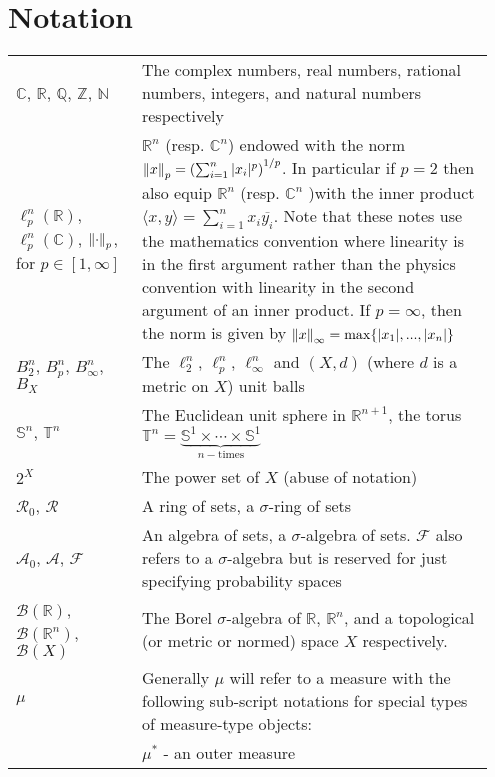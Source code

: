 \chapter*{Notation}
\begin{center}
\begin{tabular}{|p{0.25\linewidth}|p{0.7\linewidth}|}
	\hline
	$\mathbb{C}$, $\mathbb{R}$, $\mathbb{Q}$, $\mathbb{Z}$, $\mathbb{N}$ & The complex numbers, real numbers, rational numbers, integers, and natural numbers respectively \smallskip\\
	$\ell_p^n(\mathbb{R})$, $\ell_p^n(\mathbb{C})$, $\norm{\cdot}_p$, for  $p\in[1, \infty]$ & $\mathbb{R}^n$ (resp. $\mathbb{C}^n$) endowed with the norm $\norm{x}_p = \qty(\sum_{i=1}^n |x_i|^p)^{1/p}$.  In particular if $p=2$  then also equip $\mathbb{R}^n$ (resp. $\mathbb{C}^n$ )with the inner product $\langle x, y \rangle = \sum_{i=1}^n x_i\overline{y_i}$. Note that these notes use the mathematics convention where linearity is in the first argument rather than the physics convention with linearity in the second argument of an inner product. If $p=\infty$, then the norm is given by $\norm{x}_\infty = \max\{|x_1|,...,|x_n|\}$\smallskip\\
	$B_2^n$, $B_p^n$, $B_{\infty}^n$, $B_X$ & The $\ell_2^n$, $\ell_p^n$, $\ell_\infty^n$ and $(X, d)$ (where $d$ is a metric on $X$) unit balls\smallskip\\
	$\mathbb{S}^n$, $\mathbb{T}^n$ & The Euclidean unit sphere in $\mathbb{R}^{n+1}$, the torus $\mathbb{T}^n = \underbrace{\mathbb{S}^1\times \cdots \times \mathbb{S}^1}_{n-\mathrm{times}}$\smallskip \\
	$2^X$ & The power set of $X$ (abuse of notation)\smallskip\\
	$\mathcal{R}_0$, $\mathcal{R}$ & A ring of sets, a $\sigma$-ring of sets\smallskip\\
	$\mathcal{A}_0$, $\mathcal{A}$, $ \mathcal{F}$ & An algebra of sets, a $\sigma$-algebra of sets. $\mathcal{F}$ also refers to a $\sigma$-algebra but is reserved for just specifying probability spaces\smallskip\\
	$\mathcal{B}(\mathbb{R})$, $\mathcal{B}(\mathbb{R}^n)$, $\mathcal{B}(X)$ & The Borel $\sigma$-algebra of $\mathbb{R}$, $\mathbb{R}^n$, and a topological (or metric or normed) space $X$ respectively. \smallskip \\
	$\mu$ & Generally $\mu$ will refer to a measure with the following sub-script notations for special types of measure-type objects: \\
	& \qquad $\mu^*$ - an outer measure \\

\end{tabular}
\end{center}
